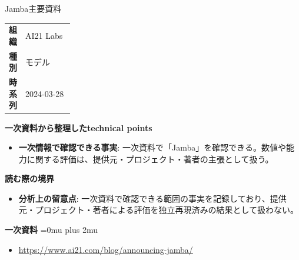 \begin{technicalnote}{Jamba}{主要資料}
\begingroup
\begin{tabularx}{\linewidth}{@{}>{\bfseries}p{0.22\linewidth}X@{}}
組織 & AI21 Labs \\
種別 & モデル \\
時系列 & 2024-03-28 \\
\end{tabularx}
\smallskip
{\bfseries 一次資料から整理したtechnical points}
\begin{itemize}[leftmargin=1.5em,itemsep=0.35em]
\item \textbf{一次情報で確認できる事実}: 一次資料で「Jamba」を確認できる。数値や能力に関する評価は、提供元・プロジェクト・著者の主張として扱う。
\end{itemize}
\begin{minipage}{\linewidth}
{\bfseries 読む際の境界}
\begin{itemize}[leftmargin=1.5em,itemsep=0.35em]
\item \textbf{分析上の留意点}: 一次資料で確認できる範囲の事実を記録しており、提供元・プロジェクト・著者による評価を独立再現済みの結果として扱わない。
\end{itemize}
\begin{samepage}
{\bfseries 一次資料}
\begingroup\sloppy
\Urlmuskip=0mu plus 2mu\relax
\begin{itemize}[leftmargin=1.5em,itemsep=0.25em]
\item {\scriptsize\url{https://www.ai21.com/blog/announcing-jamba/}}
\end{itemize}
\endgroup
\end{samepage}
\end{minipage}
\endgroup
\end{technicalnote}
\medskip

